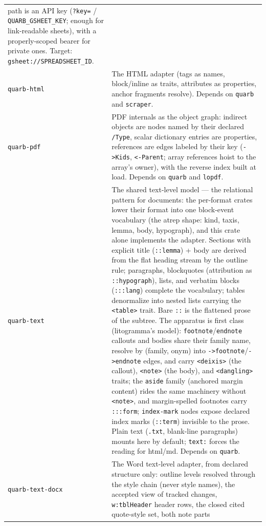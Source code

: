 \documentclass{report}
\begin{document}
\begin{xltabular}{\textwidth}{l X}
  path is an API key (\texttt{?key=} /
  \texttt{QUARB\_GSHEET\_KEY}; enough for link-readable
  sheets), with a properly-scoped bearer for private ones.
  Target: \texttt{gsheet://SPREADSHEET\_ID}. \\
\texttt{quarb-html} & The HTML adapter (tags as names, block/inline
  as traits, attributes as properties, anchor fragments resolve).
  Depends on \texttt{quarb} and \texttt{scraper}. \\
\texttt{quarb-pdf} & PDF internals as the object graph: indirect
  objects are nodes named by their declared \texttt{/Type},
  scalar dictionary entries are properties, references are edges
  labeled by their key (\texttt{->Kids}, \texttt{<-Parent}; array
  references hoist to the array's owner), with the reverse index
  built at load. Depends on \texttt{quarb} and \texttt{lopdf}. \\
\texttt{quarb-text} & The shared text-level model — the relational
  pattern for documents: the per-format crates lower their format into one
  block-event vocabulary (the atrep shape: kind, taxis, lemma,
  body, hypograph), and this crate alone implements the adapter.
  Sections with explicit title (\texttt{::lemma}) + body are
  derived from the flat heading stream by the outline rule;
  paragraphs, blockquotes (attribution as \texttt{::hypograph}),
  lists, and verbatim blocks (\texttt{:::lang}) complete the
  vocabulary; tables denormalize into nested lists carrying the
  \texttt{<table>} trait. Bare \texttt{::} is the flattened prose
  of the subtree. The apparatus is first class (litogramma's
  model): \texttt{footnote}/\texttt{endnote} callouts and bodies
  share their family name, resolve by (family, onym) into
  \texttt{->footnote}/\texttt{->endnote} edges, and carry
  \texttt{<deixis>} (the callout), \texttt{<note>} (the body),
  and \texttt{<dangling>} traits; the \texttt{aside} family
  (anchored margin content) rides the same machinery without
  \texttt{<note>}, and margin-spelled footnotes carry
  \texttt{:::form}; \texttt{index-mark} nodes expose
  declared index marks (\texttt{::term}) invisible to the prose. Plain text (\texttt{.txt}, blank-line
  paragraphs) mounts here by default; \texttt{text:} forces the
  reading for html/md. Depends on \texttt{quarb}. \\
\texttt{quarb-text-docx} & The Word text-level adapter,
  from declared structure only: outline levels resolved through
  the style chain (never style names), the accepted view of
  tracked changes, \texttt{w:tblHeader} header rows, the closed
  cited quote-style set, both note parts

\end{xltabular}
\end{document}
